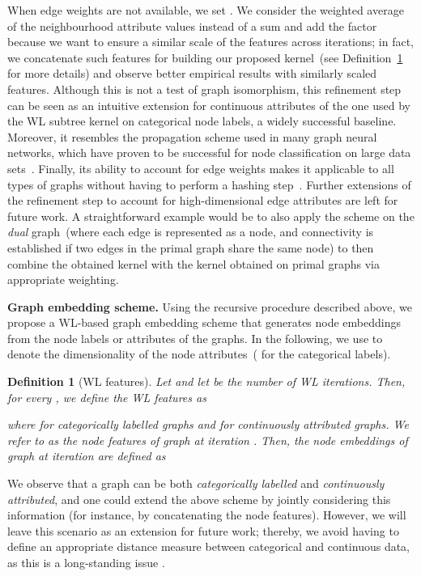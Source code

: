 \documentclass{article}
\newtheorem{definition}{Definition}
\begin{document}
When edge weights are not available, we set .
We consider the weighted average of the neighbourhood attribute values instead of a sum and add the  factor because we want to ensure a similar scale of the features across iterations; in fact, we  concatenate such features for building our proposed kernel~(see Definition~\ref{def:dwl_embedding} for more details) and observe better empirical results with similarly scaled features. 
Although this is not a test of graph isomorphism, this refinement step can be seen as an intuitive extension for continuous attributes of the one used by the WL subtree kernel on categorical node labels, a widely successful baseline. 
Moreover, it resembles the propagation scheme used in many graph neural networks, which have proven to be successful for node classification on large data sets~\citep{duvenaud2015convolutional, kipf2017semi, klicpera2018combining}. 
Finally, its ability to account for edge weights makes it applicable to all types of graphs without having to perform a hashing step~\citep{morris2016faster}. 
Further extensions of the refinement step to account for high-dimensional edge attributes are left for future work. A straightforward example would be to also apply the scheme on the \emph{dual} graph~(where each edge is represented as a node, and connectivity is established if two edges in the primal graph share the same node) to then combine the obtained kernel with the kernel obtained on primal graphs via appropriate weighting. 


\textbf{Graph embedding scheme.} Using the recursive procedure described above, we propose a WL-based graph embedding scheme that generates node embeddings from the node labels or attributes of the graphs. In the following, we use  to denote the dimensionality of the node attributes~( for the categorical labels).

\begin{definition}[WL features]
\label{def:dwl_embedding}
Let  and let  be the number of WL iterations. Then, for every , we define the WL features as 

where  for categorically labelled graphs and  for continuously attributed graphs. We refer to  as the \emph{node features} of graph  at iteration . Then, the node embeddings of graph  at iteration  are defined as


\end{definition}

We observe that a graph can be both \textit{categorically labelled} and \textit{continuously attributed}, and one could extend the above scheme by jointly considering this information (for instance, by concatenating the node features).
However, we will leave this scenario as an extension for future work; thereby, we avoid having to define an appropriate distance measure between categorical and continuous data, as this is a long-standing issue \citep{stevens1946theory}.
\end{document}
